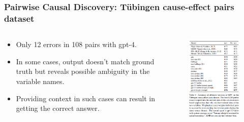 \documentclass{beamer}
\begin{document}
\begin{frame}
	\frametitle{Pairwise Causal Discovery: T\"{u}bingen cause-effect pairs dataset}
	\begin{columns}
		\begin{column}{0.5 \textwidth}
			\begin{itemize}
				\item Only 12 errors in 108 pairs with gpt-4.
				\item In some cases, output doesn't match ground truth but reveals possible ambiguity in the variable names.
				\item Providing context in such cases can result in getting the correct answer.
			\end{itemize}
		\end{column}
		\begin{column}{0.5 \textwidth}
			\begin{figure}
				\includegraphics[scale=0.4]{imgs/table2.png}
			\end{figure}
		\end{column}
	\end{columns}
\end{frame}
\end{document}
